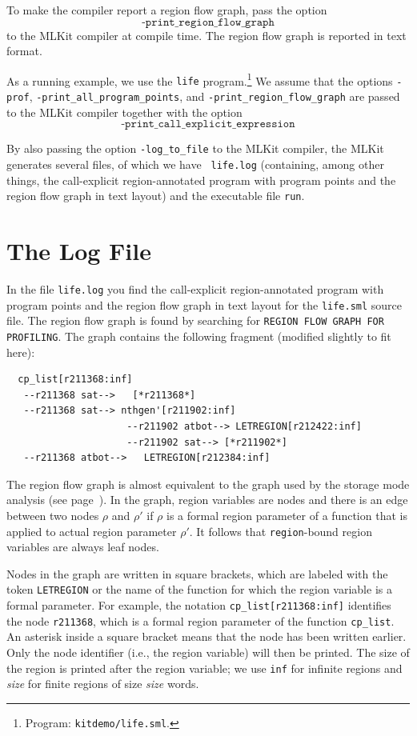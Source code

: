 \documentclass[12pt]{book}
\begin{document}
To make the compiler report a region flow graph, pass the option
%
$$\texttt{-print\_region\_flow\_graph}$$
to the MLKit compiler at compile
time. The region flow graph is reported in text format.

As a running example, we use the
%
{\tt life} program.\footnote{Program: \texttt{kitdemo/life.sml}.}  We
assume that the options \texttt{-prof},
\texttt{-print\_all\_program\_points}, and
\texttt{-print\_region\_flow\_graph} are passed to the MLKit compiler
together with the option $$\texttt{-print\_call\_explicit\_expression}$$

By also passing the option \texttt{-log\_to\_file} to the MLKit
compiler, the MLKit generates several files, of which we have {\tt
  life.log} (containing, among other things, the call-explicit
region-annotated program with program points and the region flow graph
in text layout) and the executable file {\tt run}.

\section{The Log File}
In the file {\tt life.log} you find the call-explicit region-annotated
program with program points and the region flow graph in text layout
for the {\tt life.sml} source file.  The region flow graph is found by
searching for \texttt{REGION FLOW GRAPH FOR PROFILING}. The graph
contains the following fragment (modified slightly to fit here):\label{reg_flow_graph.ex}
\begin{verbatim}
  cp_list[r211368:inf]
   --r211368 sat-->   [*r211368*]
   --r211368 sat--> nthgen'[r211902:inf]
                     --r211902 atbot--> LETREGION[r212422:inf]
                     --r211902 sat--> [*r211902*]
   --r211368 atbot-->   LETREGION[r212384:inf]
\end{verbatim}
The region flow graph is almost equivalent to the graph used by the
storage mode analysis (see page~\pageref{region flow graph}). In the
graph, region variables are nodes and there is an edge between two nodes
$\rho$ and $\rho'$ if $\rho$ is a formal region parameter of a
function that is applied to actual region parameter $\rho'$. It
follows that \texttt{region}-bound region variables are always leaf
nodes.

Nodes in the graph are written in square brackets, which are labeled
with the token {\tt LETREGION} or the name of the function for which
the region variable is a formal parameter. For example, the notation
\texttt{cp\_list[r211368:inf]} identifies the node \texttt{r211368},
which is a formal region parameter of the function \texttt{cp\_list}.
An asterisk inside a square bracket means that the node has been
written earlier.  Only the node identifier (i.e., the region variable)
will then be printed. The size of the region is printed after the
region variable; we use {\tt inf} for infinite regions and {\em
  size\/} for finite regions of size {\em size\/} words.
\end{document}

